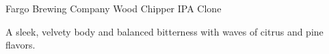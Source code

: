 \begin{recipe}{Fargo Brewing Company Wood Chipper IPA Clone} %

\begin{aboutblock}
A sleek, velvety body and balanced bitterness with waves of citrus and pine
flavors. \sourceaha
\end{aboutblock}


\begin{methodandtiming}
 
\begin{mashsteps}
\end{mashsteps}

\end{methodandtiming}

\recipebreak

\begin{ingredientsblock}

\begin{malts}
\end{malts}

\begin{hops}
\end{hops}


\end{ingredientsblock}

\end{recipe}

